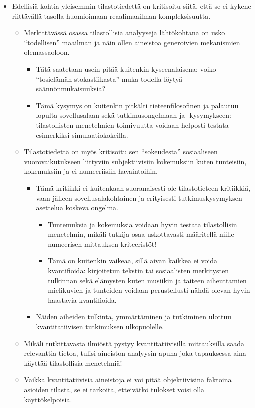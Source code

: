 \documentclass[
]{book}
\providecommand{\tightlist}{%
  \setlength{\itemsep}{0pt}\setlength{\parskip}{0pt}}
\begin{document}
\begin{itemize}
\tightlist
\item
  Edellisiä kohtia yleisemmin tilastotiedettä on kritisoitu siitä, että se ei kykene riittävällä tasolla huomioimaan reaalimaailman kompleksisuutta.

  \begin{itemize}
  \tightlist
  \item
    Merkittävässä osassa tilastollisia analyyseja lähtökohtana on usko ``todellisen'' maailman ja näin ollen aineistoa generoivien mekanismien olemassaoloon.

    \begin{itemize}
    \tightlist
    \item
      Tätä saatetaan usein pitää kuitenkin kyseenalaisena: voiko ``tosielämän stokastiikasta'' muka todella löytyä säännönmukaisuuksia?
    \item
      Tämä kysymys on kuitenkin pitkälti tieteenfilosofinen ja palautuu lopulta sovellusalaan sekä tutkimusongelmaan ja -kysymykseen: tilastollisten menetelmien toimivuutta voidaan helposti testata esimerkiksi simulaatiokokeilla.\\
    \end{itemize}
  \item
    Tilastotiedettä on myös kritisoitu sen ``sokeudesta'' sosiaaliseen vuorovaikutukseen liittyviin subjektiivisiin kokemuksiin kuten tunteisiin, kokemuksiin ja ei-numeeriisiin havaintoihin.

    \begin{itemize}
    \tightlist
    \item
      Tämä kritiikki ei kuitenkaan suoranaisesti ole tilastotieteen kritiikkiä, vaan jälleen sovellusalakohtainen ja erityisesti tutkimuskysymyksen asettelua koskeva ongelma.

      \begin{itemize}
      \tightlist
      \item
        Tuntemuksia ja kokemuksia voidaan hyvin testata tilastollisin menetelmin, mikäli tutkija osaa uskottavasti määritellä niille numeerisen mittauksen kriteeristöt!
      \item
        Tämä on kuitenkin vaikeaa, sillä aivan kaikkea ei voida kvantifioida: kirjoitetun tekstin tai sosiaalisten merkitysten tulkinnan sekä elämysten kuten musiikin ja taiteen aiheuttamien mielikuvien ja tunteiden voidaan perustellusti nähdä olevan hyvin haastavia kvantifioida.
      \end{itemize}
    \item
      Näiden aiheiden tulkinta, ymmärtäminen ja tutkiminen ulottuu kvantitatiivisen tutkimuksen ulkopuolelle.
    \end{itemize}
  \item
    Mikäli tutkittavasta ilmiöstä pystyy kvantitatiivisilla mittauksilla saada relevanttia tietoa, tulisi aineiston analyysin apuna joka tapauksessa aina käyttää tilastollisia menetelmiä!
  \item
    Vaikka kvantitatiivisia aineistoja ei voi pitää objektiivisina faktoina asioiden tilasta, se ei tarkoita, etteivätkö tulokset voisi olla käyttökelpoisia.
  \end{itemize}
\end{itemize}
\end{document}
